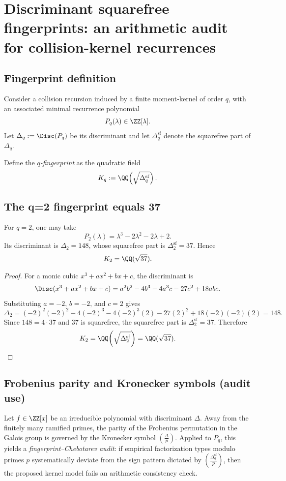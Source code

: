 \section{Discriminant squarefree fingerprints: an arithmetic audit for collision-kernel recurrences}
\label{sec:fingerprint}

\subsection{Fingerprint definition}
Consider a collision recursion induced by a finite moment-kernel of order \(q\), with an associated minimal recurrence polynomial
\[
P_q(\lambda)\in \ZZ[\lambda].
\]
Let \(\Delta_q:=\Disc(P_q)\) be its discriminant and let \(\Delta_q^{\mathrm{sf}}\) denote the squarefree part of \(\Delta_q\).

\begin{definition}
Define the \emph{\(q\)-fingerprint} as the quadratic field
\[
K_q := \QQ\!\left(\sqrt{\Delta_q^{\mathrm{sf}}}\right).
\]
\end{definition}

\subsection{The q=2 fingerprint equals 37}
\begin{proposition}\label{prop:q2}
For \(q=2\), one may take
\[
P_2(\lambda)=\lambda^3-2\lambda^2-2\lambda+2.
\]
Its discriminant is \(\Delta_2=148\), whose squarefree part is \(\Delta_2^{\mathrm{sf}}=37\). Hence
\[
K_2=\QQ(\sqrt{37}).
\]
\end{proposition}

\begin{proof}
For a monic cubic \(x^3+ax^2+bx+c\), the discriminant is
\[
\Disc(x^3+ax^2+bx+c)=a^2b^2-4b^3-4a^3c-27c^2+18abc.
\]
Substituting \(a=-2\), \(b=-2\), and \(c=2\) gives
\[
\Delta_2
=
(-2)^2(-2)^2-4(-2)^3-4(-2)^3(2)-27(2)^2+18(-2)(-2)(2)
=
148.
\]
Since \(148=4\cdot 37\) and \(37\) is squarefree, the squarefree part is \(\Delta_2^{\mathrm{sf}}=37\). Therefore
\[
K_2=\QQ\!\left(\sqrt{\Delta_2^{\mathrm{sf}}}\right)=\QQ(\sqrt{37}).
\]
\end{proof}

\subsection{Frobenius parity and Kronecker symbols (audit use)}
Let \(f\in \ZZ[x]\) be an irreducible polynomial with discriminant \(\Delta\). Away from the finitely many ramified primes, the parity of the Frobenius permutation in the Galois group is governed by the Kronecker symbol \(\left(\frac{\Delta}{p}\right)\). Applied to \(P_q\), this yields a \emph{fingerprint--Chebotarev audit}: if empirical factorization types modulo primes \(p\) systematically deviate from the sign pattern dictated by \(\left(\frac{\Delta_q^{\mathrm{sf}}}{p}\right)\), then the proposed kernel model fails an arithmetic consistency check.

